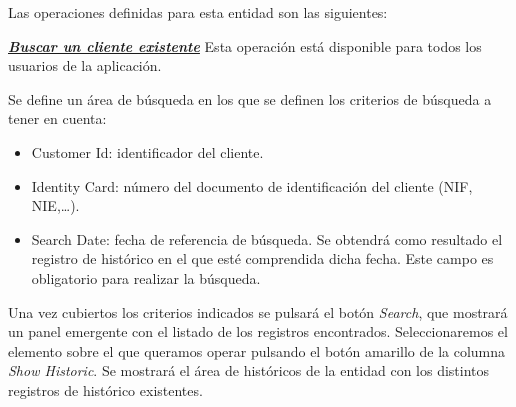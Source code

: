 Las operaciones definidas para esta entidad son las siguientes:


\underline{\textsl{\textbf{Buscar un cliente existente}}}\newline
Esta operación está disponible para todos los usuarios de la aplicación.

Se define un área de búsqueda en los que se definen los criterios de búsqueda a tener en cuenta:
\begin{itemize}
\item Customer Id: identificador del cliente.
\item Identity Card: número del documento de identificación del cliente (NIF, NIE,\dots).
\item Search Date: fecha de referencia de búsqueda. Se obtendrá como resultado el registro de histórico en el que esté comprendida dicha fecha. Este campo es obligatorio para realizar la búsqueda.
\end{itemize}

Una vez cubiertos los criterios indicados se pulsará el botón \emph{Search}, que mostrará un panel emergente con el listado de los registros encontrados. Seleccionaremos el elemento sobre el que queramos operar pulsando el botón amarillo de la columna \emph{Show Historic}. Se mostrará el área de históricos de la entidad con los distintos registros de histórico existentes.


